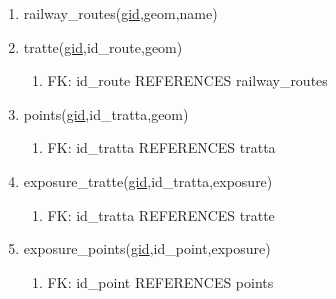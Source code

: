 	\begin{enumerate}
	\item railway\_routes(\underline{gid},geom,name)
	\item tratte(\underline{gid},id\_route,geom)
	\begin{enumerate}
		\item FK: id\_route REFERENCES railway\_routes  
	\end{enumerate} 
	\item points(\underline{gid},id\_tratta,geom)
	\begin{enumerate}
		\item FK: id\_tratta REFERENCES tratta  
	\end{enumerate}
	\item exposure\_tratte(\underline{gid},id\_tratta,exposure)
	\begin{enumerate}
		\item FK: id\_tratta REFERENCES tratte 
	\end{enumerate}
	\item exposure\_points(\underline{gid},id\_point,exposure)
	\begin{enumerate}
		\item FK: id\_point REFERENCES points  
	\end{enumerate}
\end{enumerate}
